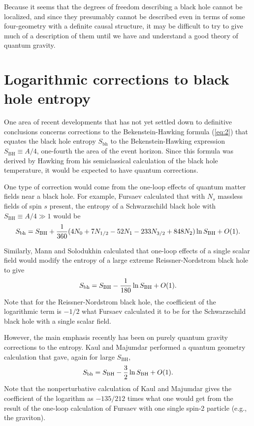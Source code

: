 \documentclass[12pt]{article} \usepackage{latexsym}
\begin{document}
Because it seems that the degrees of freedom describing a black hole
cannot be localized, and since they presumably cannot be described
even in terms of some four-geometry with a definite causal structure,
it may be difficult to try to give much of a description of them until
we have and understand a good theory of quantum gravity.

\section{Logarithmic corrections to black hole entropy}

One area of recent developments that has not yet settled down to
definitive conclusions concerns corrections to the Bekenstein-Hawking
formula (\ref{eq:2}) that equates the black hole entropy
$S_{\mathrm{bh}}$ to the Bekenstein-Hawking expression $S_{\mathrm{BH}}
\equiv A/4$, one-fourth the area of the event horizon.  Since this
formula was derived by Hawking from his semiclassical calculation of
the black hole temperature, it would be expected to have quantum
corrections.

One type of correction would come from the one-loop effects of quantum
matter fields near a black hole.  For example, Fursaev \cite{Fur}
calculated that with $N_s$ massless fields of spin $s$ present, the
entropy of a Schwarzschild black hole with $S_{\mathrm{BH}} \equiv A/4
\gg 1$ would be
 \begin{equation}
 S_{\mathrm{bh}} = S_{\mathrm{BH}} + {1\over 360}(4N_0 + 7N_{1/2} -
 52N_1 - 233N_{3/2} + 848N_2) \ln{S_{\mathrm{BH}}} + O(1).
 \label{eq:20}
 \end{equation}

Similarly, Mann and Solodukhin \cite{ManSol} calculated that one-loop
effects of a single scalar field would modify the entropy of a large
extreme Reissner-Nordstrom black hole to give
 \begin{equation}
 S_{\mathrm{bh}} = S_{\mathrm{BH}} - {1\over 180} \ln{S_{\mathrm{BH}}} +
 O(1).
 \label{eq:21}
 \end{equation}
Note that for the Reissner-Nordstrom black hole, the coefficient of the
logarithmic term is $-1/2$ what Fursaev calculated it to be for the
Schwarzschild black hole with a single scalar field.

However, the main emphasis recently has been on purely quantum gravity
corrections to the entropy.  Kaul and Majumdar \cite{KM} performed a
quantum geometry calculation that gave, again for large
$S_{\mathrm{BH}}$,
 \begin{equation}
 S_{\mathrm{bh}} = S_{\mathrm{BH}} - {3\over 2} \ln{S_{\mathrm{BH}}} +
 O(1).
 \label{eq:22}
 \end{equation}
Note that the nonperturbative calculation of Kaul and Majumdar gives the
coefficient of the logarithm as $-135/212$ times what one would get from
the result of the one-loop calculation of Fursaev with one single spin-2
particle (e.g., the graviton).
\end{document}
